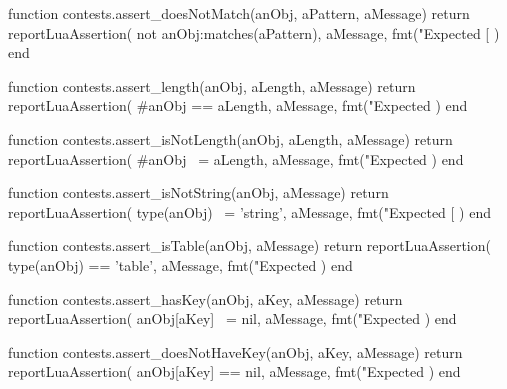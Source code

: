 \stopTestSuite


\startLuaCode
function contests.assert_doesNotMatch(anObj, aPattern, aMessage)
  return reportLuaAssertion(
    not anObj:matches(aPattern),
    aMessage,
    fmt("Expected [%
  )
end
\stopLuaCode

\stopTestSuite


\startLuaCode
function contests.assert_length(anObj, aLength, aMessage)
  return reportLuaAssertion(
    #anObj == aLength,
    aMessage,
    fmt("Expected %
  )
end
\stopLuaCode

\stopTestSuite


\startLuaCode
function contests.assert_isNotLength(anObj, aLength, aMessage)
  return reportLuaAssertion(
    #anObj ~= aLength,
    aMessage,
    fmt("Expected %
  )
end
\stopLuaCode

\stopTestSuite


\startLuaCode
function contests.assert_isNotString(anObj, aMessage)
  return reportLuaAssertion(
    type(anObj) ~= 'string',
    aMessage,
    fmt("Expected [%
  )
end
\stopLuaCode

\stopTestSuite


\startLuaCode
function contests.assert_isTable(anObj, aMessage)
  return reportLuaAssertion(
    type(anObj) == 'table',
    aMessage,
    fmt("Expected %
  )
end
\stopLuaCode

\stopTestSuite


\startLuaCode
function contests.assert_hasKey(anObj, aKey, aMessage)
  return reportLuaAssertion(
    anObj[aKey] ~= nil,
    aMessage,
    fmt("Expected %
  )
end
\stopLuaCode

\stopTestSuite


\startLuaCode
function contests.assert_doesNotHaveKey(anObj, aKey, aMessage)
  return reportLuaAssertion(
    anObj[aKey] == nil,
    aMessage,
    fmt("Expected %
  )
end
\stopLuaCode

